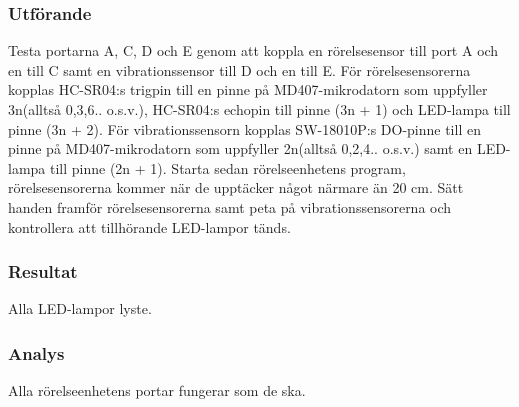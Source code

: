 \subsubsection*{Utförande}
Testa portarna A, C, D och E genom att koppla en rörelsesensor till port A och en till C samt en vibrationssensor till D och en till E. För rörelsesensorerna kopplas HC-SR04:s trigpin till en pinne på MD407-mikrodatorn som uppfyller 3n(alltså 0,3,6.. o.s.v.), HC-SR04:s echopin till pinne (3n + 1) och LED-lampa till pinne (3n + 2). 
För vibrationssensorn kopplas SW-18010P:s DO-pinne till en pinne på MD407-mikrodatorn som uppfyller 2n(alltså 0,2,4.. o.s.v.) samt en LED-lampa till pinne (2n + 1). 
Starta sedan rörelseenhetens program, rörelsesensorerna kommer när de upptäcker något närmare än 20 cm. Sätt handen framför rörelsesensorerna samt peta på vibrationssensorerna och kontrollera att tillhörande LED-lampor tänds.


\subsubsection*{Resultat}
Alla LED-lampor lyste.


\subsubsection*{Analys}
Alla rörelseenhetens portar fungerar som de ska.


